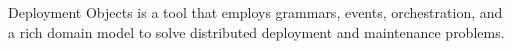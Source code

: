 

Deployment Objects is a tool that employs grammars, events, orchestration, and a
rich domain model to solve distributed deployment and maintenance problems.
